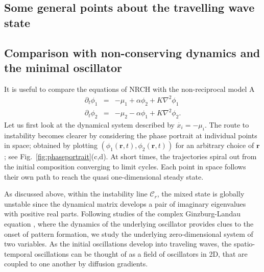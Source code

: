 \subsection{Some general points about the travelling wave state}


\subsection{Comparison with non-conserving dynamics and the minimal oscillator}
It is useful to compare the equations of NRCH with the non-reciprocal model A 
\begin{eqnarray}
    \partial_t \phi_1 &=& - \mu_1 + \alpha \phi_2 + K \nabla^2 \phi_1\\
    \partial_t \phi_2 &=& - \mu_2 - \alpha \phi_1 + K \nabla^2 \phi_2.
    \label{eq:NonReciprocalModelA}
\end{eqnarray}
Let us first look at the dynamical system described by $\dot{x_i} = - \mu_i$. The route to instability becomes clearer by considering the phase portrait at individual points in space;  obtained by plotting $(\phi_1(\bm{r},t),\phi_2(\bm{r},t))$ for an arbitrary choice of $\bm{r}$; see Fig.~\ref{fig:phaseportrait}(c,d). At short times, the trajectories spiral out from the initial composition converging to limit cycles. Each point in space follows their own path to reach the quasi one-dimensional steady state. 

As discussed above, within the instability line $\mathcal{C}_r$, the mixed state is globally unstable since the dynamical matrix develops a pair of imaginary eigenvalues with positive real parts. Following studies of the complex Ginzburg-Landau equation \cite{Aranson2002}, where the dynamics of the underlying oscillator provides clues to the onset of pattern formation, we study the underlying zero-dimensional system of two variables. As the initial oscillations develop into traveling waves, the spatio-temporal oscillations can be thought of as a field of oscillators in 2D, that are coupled to one another by diffusion gradients. 


